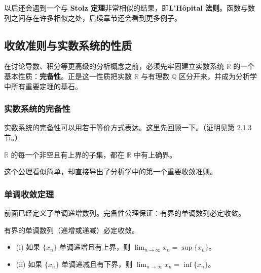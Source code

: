以后还会遇到一个与 \textbf{Stolz 定理}非常相似的结果，即\textbf{L'Hôpital 法则}。函数与数列之间存在许多相似之处，后续章节还会看到更多例子。

\subsection{收敛准则与实数系统的性质}

在讨论导数、积分等更高级的分析概念之前，必须先牢固建立实数系统 $\mathbb{R}$ 的一个基本性质：\textbf{完备性}。正是这一性质把实数 $\mathbb{R}$ 与有理数 $\mathbb{Q}$ 区分开来，并成为分析学中所有重要定理的基石。

\subsubsection{实数系统的完备性}

实数系统的完备性可以用若干等价方式表达。这里先回顾一下。（证明见第 2.1.3 节。）

\begin{theorem}[完备性公理]
\label{thm:completeness_cn}
$\mathbb{R}$ 的每一个非空且有上界的子集，都在 $\mathbb{R}$ 中有上确界。
\end{theorem}

这个公理看似简单，却直接导出了分析学中的第一个重要收敛准则。

\subsubsection{单调收敛定理}

前面已经定义了单调递增数列。完备性公理保证：有界的单调数列必定收敛。

\begin{theorem}[单调收敛定理]
\label{thm:mct_cn}
有界的单调数列（递增或递减）必定收敛。
\begin{itemize}
    \item (i) 如果 $\{x_n\}$ 单调递增且有上界，则 $\lim_{n\to \infty}x_n=\sup\{x_n\}$。
    \item (ii) 如果 $\{x_n\}$ 单调递减且有下界，则 $\lim_{n\to \infty}x_n=\inf\{x_n\}$。
\end{itemize}
\end{theorem}

